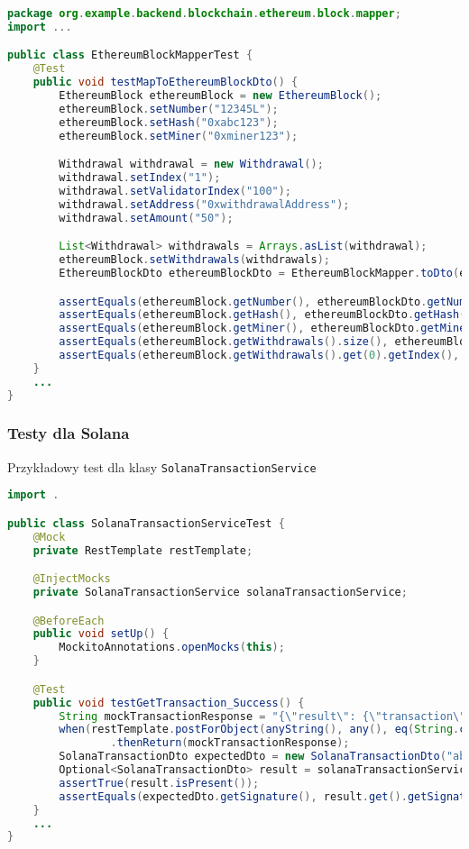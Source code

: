\begin{lstlisting}[language=Java, style=JavaStyle]
package org.example.backend.blockchain.ethereum.block.mapper;
import ...

public class EthereumBlockMapperTest {
    @Test
    public void testMapToEthereumBlockDto() {
        EthereumBlock ethereumBlock = new EthereumBlock();
        ethereumBlock.setNumber("12345L");
        ethereumBlock.setHash("0xabc123");
        ethereumBlock.setMiner("0xminer123");

        Withdrawal withdrawal = new Withdrawal();
        withdrawal.setIndex("1");
        withdrawal.setValidatorIndex("100");
        withdrawal.setAddress("0xwithdrawalAddress");
        withdrawal.setAmount("50");

        List<Withdrawal> withdrawals = Arrays.asList(withdrawal);
        ethereumBlock.setWithdrawals(withdrawals);
        EthereumBlockDto ethereumBlockDto = EthereumBlockMapper.toDto(ethereumBlock);

        assertEquals(ethereumBlock.getNumber(), ethereumBlockDto.getNumber());
        assertEquals(ethereumBlock.getHash(), ethereumBlockDto.getHash());
        assertEquals(ethereumBlock.getMiner(), ethereumBlockDto.getMiner());
        assertEquals(ethereumBlock.getWithdrawals().size(), ethereumBlockDto.getWithdrawals().size());
        assertEquals(ethereumBlock.getWithdrawals().get(0).getIndex(), ethereumBlockDto.getWithdrawals().get(0).getIndex());
    }
    ...
}
\end{lstlisting}

\subsubsection{Testy dla Solana}

Przykładowy test dla klasy \texttt{SolanaTransactionService}

\begin{lstlisting}[language=Java, style=JavaStyle]
import .

public class SolanaTransactionServiceTest {
    @Mock
    private RestTemplate restTemplate;

    @InjectMocks
    private SolanaTransactionService solanaTransactionService;

    @BeforeEach
    public void setUp() {
        MockitoAnnotations.openMocks(this);
    }

    @Test
    public void testGetTransaction_Success() {
        String mockTransactionResponse = "{\"result\": {\"transaction\": {\"signature\": \"...\"}}}";
        when(restTemplate.postForObject(anyString(), any(), eq(String.class)))
                .thenReturn(mockTransactionResponse);
        SolanaTransactionDto expectedDto = new SolanaTransactionDto("abcd1234");
        Optional<SolanaTransactionDto> result = solanaTransactionService.getTransaction("...");
        assertTrue(result.isPresent());
        assertEquals(expectedDto.getSignature(), result.get().getSignature());
    }
    ...
}
\end{lstlisting}

